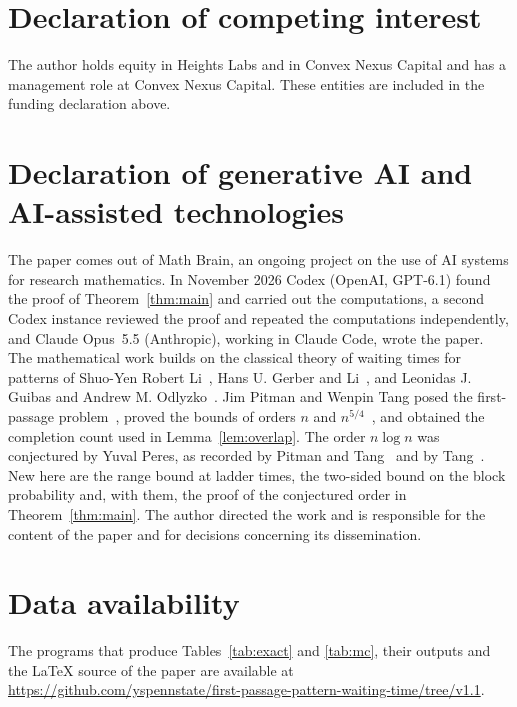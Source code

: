 \documentclass[11pt]{amsart}
\theoremstyle{remark}
\numberwithin{equation}{section}
\begin{document}
\section*{Declaration of competing interest}
The author holds equity in Heights Labs and in Convex Nexus Capital and
has a management role at Convex Nexus Capital. These entities are included
in the funding declaration above.

\section*{Declaration of generative AI and AI-assisted technologies}
The paper comes out of Math Brain, an ongoing project on the use of AI systems for research mathematics. In November 2026 Codex (OpenAI, GPT-6.1) found the proof of Theorem~\ref{thm:main} and carried out the computations, a second Codex instance reviewed the proof and repeated the computations independently, and Claude Opus~5.5 (Anthropic), working in Claude Code, wrote the paper. The mathematical work builds on the classical theory of waiting times for patterns of Shuo-Yen Robert Li~\cite{Li}, Hans U. Gerber and Li~\cite{GL}, and Leonidas J. Guibas and Andrew M. Odlyzko~\cite{GO}. Jim Pitman and Wenpin Tang posed the first-passage problem~\cite[Question~1.7]{PT}, proved the bounds of orders $n$ and $n^{5/4}$~\cite[Theorem~1.8]{PT}, and obtained the completion count used in Lemma~\ref{lem:overlap}. The order $n\log n$ was conjectured by Yuval Peres, as recorded by Pitman and Tang~\cite[Conjecture~1]{PTpub} and by Tang~\cite[Conjecture~2.5.2]{Tang}. New here are the range bound at ladder times, the two-sided bound on the block probability and, with them, the proof of the conjectured order in Theorem~\ref{thm:main}. The author directed the work and is responsible for the content of the paper and for decisions concerning its dissemination.

\section*{Data availability}
The programs that produce Tables~\ref{tab:exact} and \ref{tab:mc}, their outputs and the \LaTeX{} source of the paper are available at \url{https://github.com/yspennstate/first-passage-pattern-waiting-time/tree/v1.1}.
\end{document}
